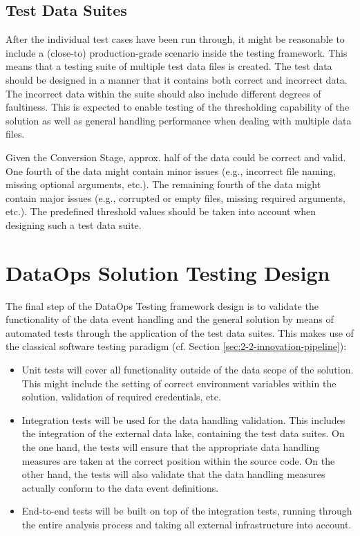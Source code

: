 \subsection{Test Data Suites} \label{sec:4-test-suites}
After the individual test cases have been run through, it might be reasonable to include a (close-to) production-grade scenario inside the testing framework. This means that a testing suite of multiple test data files is created. The test data should be designed in a manner that it contains both correct and incorrect data. The incorrect data within the suite should also include different degrees of faultiness. This is expected to enable testing of the thresholding capability of the solution as well as general handling performance when dealing with multiple data files.

Given the Conversion Stage, approx. half of the data could be correct and valid. One fourth of the data might contain minor issues (e.g., incorrect file naming, missing optional arguments, etc.). The remaining fourth of the data might contain major issues (e.g., corrupted or empty files, missing required arguments, etc.). The predefined threshold values should be taken into account when designing such a test data suite.


\section{DataOps Solution Testing Design} \label{sec:4-3-testing-architecture}
The final step of the DataOps Testing framework design is to validate the functionality of the data event handling and the general solution by means of automated tests through the application of the test data suites. This makes use of the classical software testing paradigm (cf. Section \ref{sec:2-2-innovation-pipeline}):

\begin{itemize}
	\item Unit tests will cover all functionality outside of the data scope of the solution. This might include the setting of correct environment variables within the solution, validation of required credentials, etc.
	\item  Integration tests will be used for the data handling validation. This includes the integration of the external data lake, containing the test data suites. On the one hand, the tests will ensure that the appropriate data handling measures are taken at the correct position within the source code. On the other hand, the tests will also validate that the data handling measures actually conform to the data event definitions.
	\item  End-to-end tests will be built on top of the integration tests, running through the entire analysis process and taking all external infrastructure into account.
\end{itemize}
